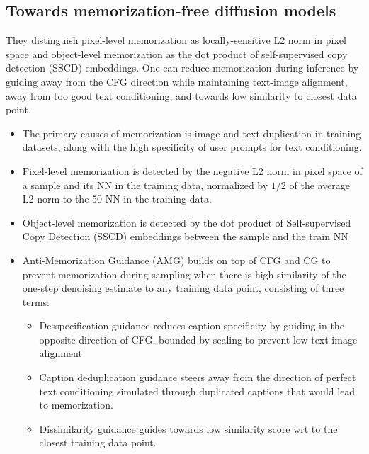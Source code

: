 \documentclass{article}
\begin{document}
\subsection{Towards memorization-free diffusion models}   
\begin{tldr}
    They distinguish pixel-level memorization as locally-sensitive L2 norm in pixel space and object-level memorization as the dot product of self-supervised copy detection (SSCD) embeddings. One can reduce memorization during inference by guiding away from the CFG direction while maintaining text-image alignment, away from too good text conditioning, and towards low similarity to closest data point.
\end{tldr}
\begin{itemize}
    \item The primary causes of memorization is image and text duplication in training datasets, along with the high specificity of user prompts for text conditioning.
    \item Pixel-level memorization is detected by the negative L2 norm in pixel space of a sample and its NN in the training data, normalized by $1/2$ of the average L2 norm to the 50 NN in the training data. 
    \item Object-level memorization is detected by the dot product of Self-supervised Copy Detection (SSCD) embeddings between the sample and the train NN
    \item Anti-Memorization Guidance (AMG) builds on top of CFG and CG to prevent memorization during sampling when there is high similarity of the one-step denoising estimate to any training data point, consisting of three terms:
    \begin{itemize}
        \item Desspecification guidance reduces caption specificity by guiding in the opposite direction of CFG, bounded by scaling to prevent low text-image alignment
        \item Caption deduplication guidance steers away from the direction of perfect text conditioning simulated through duplicated captions that would lead to memorization.
        \item Dissimilarity guidance guides towards low similarity score wrt to the closest training data point.
    \end{itemize}
\end{itemize}
\end{document}
